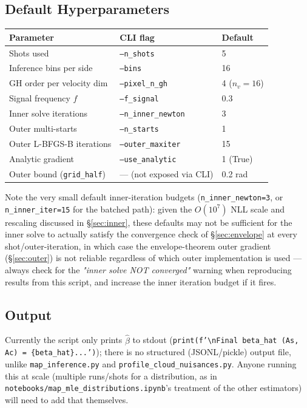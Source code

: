 \documentclass[11pt,a4paper]{article}
\newcommand{\code}[1]{\texttt{#1}}
\begin{document}
\subsection{Default Hyperparameters}

\begin{center}
\begin{tabular}{@{}lll@{}}
\toprule
Parameter & CLI flag & Default \\
\midrule
Shots used & \code{--n\_shots} & 5 \\
Inference bins per side & \code{--bins} & 16 \\
GH order per velocity dim & \code{--pixel\_n\_gh} & 4 ($n_v=16$) \\
Signal frequency $f$ & \code{--f\_signal} & 0.3 \\
Inner solve iterations & \code{--n\_inner\_newton} & 3 \\
Outer multi-starts & \code{--n\_starts} & 1 \\
Outer L-BFGS-B iterations & \code{--outer\_maxiter} & 15 \\
Analytic gradient & \code{--use\_analytic} & 1 (True) \\
Outer bound (\code{grid\_half}) & --- (not exposed via CLI) & 0.2 rad \\
\bottomrule
\end{tabular}
\end{center}

Note the very small default inner-iteration budgets
(\code{n\_inner\_newton=3}, or \code{n\_inner\_iter=15} for the batched
path): given the $O(10^7)$ NLL scale and rescaling discussed in
\S\ref{sec:inner}, these defaults may not be sufficient for the inner solve
to actually satisfy the convergence check of \S\ref{sec:envelope} at every
shot/outer-iteration, in which case the envelope-theorem outer gradient
(\S\ref{sec:outer}) is not reliable regardless of which outer
implementation is used --- always check for the
\emph{"inner solve NOT converged"} warning when reproducing results from
this script, and increase the inner iteration budget if it fires.

\subsection{Output}

Currently the script only prints $\hat\beta$ to stdout
(\code{print(f'\textbackslash nFinal beta\_hat (As, Ac) = \{beta\_hat\}...')});
there is no structured (JSONL/pickle) output file, unlike
\code{map\_inference.py} and \code{profile\_cloud\_nuisances.py}. Anyone
running this at scale (multiple runs/shots for a distribution, as in
\code{notebooks/map\_mle\_distributions.ipynb}'s treatment of the other
estimators) will need to add that themselves.
\end{document}
